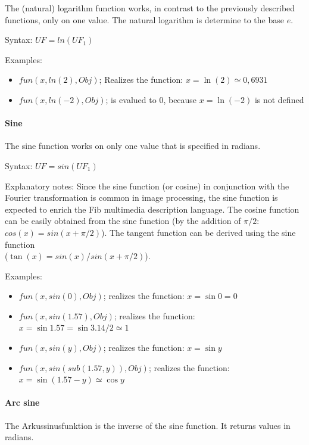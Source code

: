 The (natural) logarithm function works, in contrast to the previously described functions, only on one value. The natural logarithm is determine to the base $e$.

\bigskip\noindent
Syntax:
$UF=ln(UF_1)$

\bigskip\noindent
Examples:
\begin{itemize}
 \item $fun(x, ln(2), Obj)$; Realizes the function: $x=\ln{(2)} \simeq 0,6931$
 \item $fun(x, ln(-2), Obj)$; is evalued to $0$, because $x=\ln{(-2)}$ is not defined
\end{itemize}


\paragraph{Sine}

The sine function works on only one value that is specified in radians.

\bigskip\noindent
Syntax:
$UF=sin(UF_1)$

\bigskip\noindent
Explanatory notes:
Since the sine function (or cosine) in conjunction with the Fourier transformation is common in image processing, the sine function is expected to enrich the Fib multimedia description language. The cosine function can be easily obtained from the sine function (by the addition of $\pi/2$: $cos{(x)}=sin{(x+\pi/2)}$). The tangent function can be derived using the sine function\\ ($\tan{(x)}=sin{(x)}/sin{(x+\pi/2)}$).

\bigskip\noindent
Examples:
\begin{itemize}
 \item $fun(x, sin(0), Obj)$; realizes the function: $x=\sin{0}=0$
 \item $fun(x, sin(1.57), Obj)$; realizes the function: $x=\sin{1.57}=\sin{3.14/2} \simeq 1$
 \item $fun(x, sin(y), Obj)$; realizes the function: $x=\sin{y}$
 \item $fun(x, sin( sub( 1.57, y ) ), Obj)$; realizes the function: $x=\sin{(1.57 - y)} \simeq \cos{y}$
\end{itemize}


\paragraph{Arc sine}

The Arkussinusfunktion is the inverse of the sine function. It returns values in radians.

